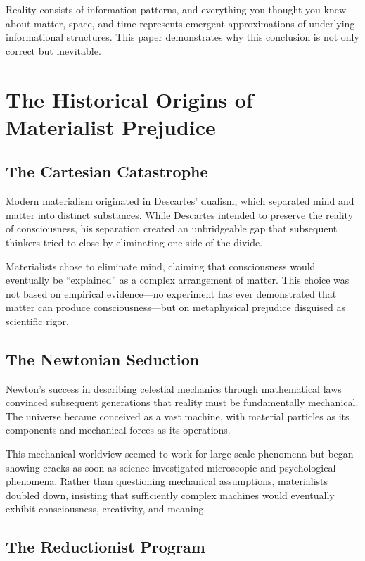 \documentclass[12pt]{article}
\begin{document}
Reality consists of information patterns, and everything you thought you knew about matter, space, and time represents emergent approximations of underlying informational structures. This paper demonstrates why this conclusion is not only correct but inevitable.

\section{The Historical Origins of Materialist Prejudice}

\subsection{The Cartesian Catastrophe}

Modern materialism originated in Descartes' dualism, which separated mind and matter into distinct substances. While Descartes intended to preserve the reality of consciousness, his separation created an unbridgeable gap that subsequent thinkers tried to close by eliminating one side of the divide.

Materialists chose to eliminate mind, claiming that consciousness would eventually be ``explained'' as a complex arrangement of matter. This choice was not based on empirical evidence—no experiment has ever demonstrated that matter can produce consciousness—but on metaphysical prejudice disguised as scientific rigor.

\subsection{The Newtonian Seduction}

Newton's success in describing celestial mechanics through mathematical laws convinced subsequent generations that reality must be fundamentally mechanical. The universe became conceived as a vast machine, with material particles as its components and mechanical forces as its operations.

This mechanical worldview seemed to work for large-scale phenomena but began showing cracks as soon as science investigated microscopic and psychological phenomena. Rather than questioning mechanical assumptions, materialists doubled down, insisting that sufficiently complex machines would eventually exhibit consciousness, creativity, and meaning.

\subsection{The Reductionist Program}
\end{document}
